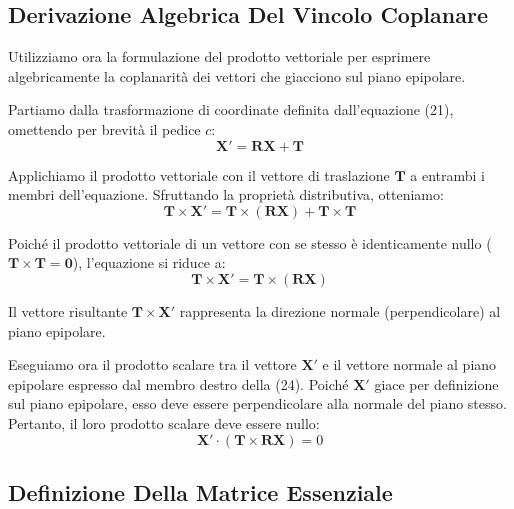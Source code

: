 ﻿\documentclass[11pt, a4paper]{article}
\begin{document}
\subsection{Derivazione Algebrica Del Vincolo Coplanare}

Utilizziamo ora la formulazione del prodotto vettoriale per esprimere algebricamente la coplanarità dei vettori che giacciono sul piano epipolare.


Partiamo dalla trasformazione di coordinate definita dall'equazione (21), omettendo per brevità il pedice $c$:
\[
\bm{X}' = \bm{R} \bm{X} + \bm{T}
\]

Applichiamo il prodotto vettoriale con il vettore di traslazione $\bm{T}$ a entrambi i membri dell'equazione. Sfruttando la proprietà distributiva, otteniamo:
\[
\bm{T} \times \bm{X}' = \bm{T} \times (\bm{R} \bm{X}) + \bm{T} \times \bm{T}
\]

Poiché il prodotto vettoriale di un vettore con se stesso è identicamente nullo ($\bm{T} \times \bm{T} = \bm{0}$), l'equazione si riduce a:
\begin{equation}
\bm{T} \times \bm{X}' = \bm{T} \times (\bm{R} \bm{X})
\end{equation}

Il vettore risultante $\bm{T} \times \bm{X}'$ rappresenta la direzione normale (perpendicolare) al piano epipolare.


Eseguiamo ora il prodotto scalare tra il vettore $\bm{X}'$ e il vettore normale al piano epipolare espresso dal membro destro della (24). Poiché $\bm{X}'$ giace per definizione sul piano epipolare, esso deve essere perpendicolare alla normale del piano stesso. Pertanto, il loro prodotto scalare deve essere nullo:
\begin{equation}
\bm{X}' \cdot (\bm{T} \times \bm{R} \bm{X}) = 0
\end{equation}



\subsection{Definizione Della Matrice Essenziale}
\end{document}
